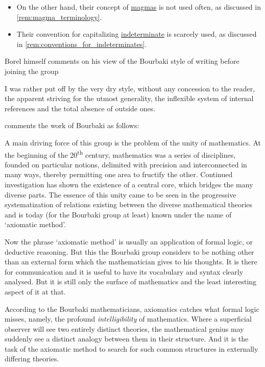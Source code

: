\begin{remark}
\begin{itemize}
    \item On the other hand, their concept of \hyperref[rem:magma_terminology]{magmas} is not used often, as discussed in \cref{rem:magma_terminology}.

    \item Their convention for capitalizing \hyperref[con:free_construction/indeterminate]{indeterminate} is scarcely used, as discussed in \cref{rem:conventions_for_indeterminates}.
  \end{itemize}

  Borel himself comments on his view of the Bourbaki style of writing before joining the group
  \begin{displayquote}
    I was rather put off by the very dry style, without any concession to the reader, the apparent striving for the utmost generality, the inflexible system of internal references and the total absence of outside ones.
  \end{displayquote}

  \textcite[121]{Kuyk1977ComplementarityInMathematics} comments the work of Bourbaki as follows:
  \begin{displayquote}
    A main driving force of this group is the problem of the unity of mathematics. At the beginning of the 20\textsuperscript{th} century, mathematics was a series of disciplines, founded on particular notions, delimited with precision and interconnected in many ways, thereby permitting one area to fructify the other. Continued investigation has shown the existence of a central core, which bridges the many diverse parts. The essence of this unity came to be seen in the progressive systematization of relations existing between the diverse mathematical theories and is today (for the Bourbaki group at least) known under the name of \enquote*{axiomatic method}.

    Now the phrase \enquote*{axiomatic method} is usually an application of formal logic, or deductive reasoning. But this the Bourbaki group considers to be nothing other than an external form which the mathematician gives to his thoughts. It is there for communication and it is useful to have its vocabulary and syntax clearly analysed. But it is still only the surface of mathematics and the least interesting aspect of it at that.

    According to the Bourbaki mathematicians, axiomatics catches what formal logic misses, namely, the profound \textit{intelligibility} of mathematics. Where a superficial observer will see two entirely distinct theories, the mathematical genius may suddenly see a distinct analogy between them in their structure. And it is the task of the axiomatic method to search for such common structures in externally differing theories.
  \end{displayquote}


\end{remark}

